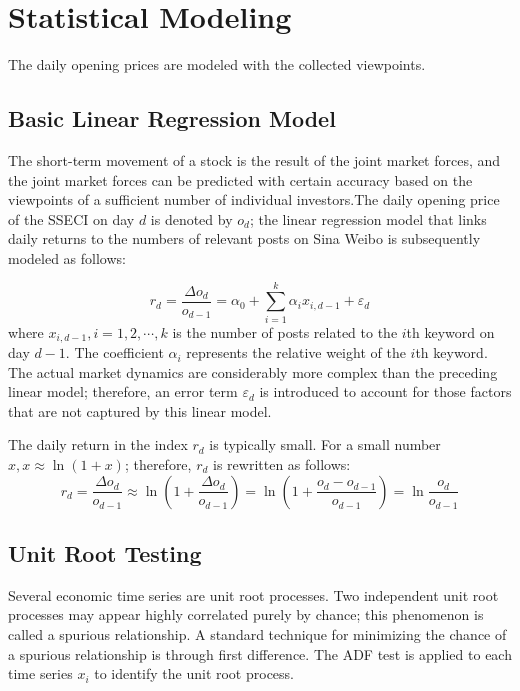 \documentclass[review,3p,times,12pt,number]{elsarticle}
\begin{document}
\section{Statistical Modeling}
\label{sec:weibo:model}

The daily opening prices are modeled with the collected viewpoints.

\subsection{Basic Linear Regression Model}
The short-term movement of a stock is the result of the joint market forces, and the joint market forces can be predicted with certain accuracy based on the viewpoints of a sufficient number of individual investors.The daily opening price of the SSECI on day $d$ is denoted by $o_d$; the linear regression model that links daily returns to the numbers of relevant posts on Sina Weibo is subsequently modeled as follows:

\begin{equation}
	r_d=\frac{ \Delta o_d }{o_{d-1}} = \alpha_0 + \sum_{i=1}^{k} \alpha_i x_{i,d-1} + \varepsilon_d \label{weibo:eqn:predict}
\end{equation}
where $x_{i,d-1}, i=1,2,\cdots, k$ is the number of posts related to the $i$th keyword on day $d-1$. The coefficient $\alpha_i$ represents the relative weight of the $i$th keyword. The actual market dynamics are considerably more complex than the preceding linear model; therefore, an error term $\varepsilon_d$ is introduced to account for those factors that are not captured by this linear model.

The daily return in the index $r_d$ is typically small. For a small number $x, x \approx \ln (1+x)$; therefore, $r_d$ is rewritten as follows:
\[
	r_d=\frac{ \Delta o_d }{o_{d-1}} \approx \ln (1 + \frac{ \Delta o_d }{o_{d-1}}) = \ln (1 + \frac{o_d - o_{d-1}}{o_{d-1}}) = \ln \frac{o_d}{o_{d-1}}
\]

\subsection{Unit Root Testing}
 Several economic time series are unit root processes. Two independent unit root processes may appear highly correlated purely by chance; this phenomenon is called a spurious relationship. A standard technique for minimizing the chance of a spurious relationship is through first difference. The ADF test is applied to each time series $x_i$ to identify the unit root process.
\end{document}
